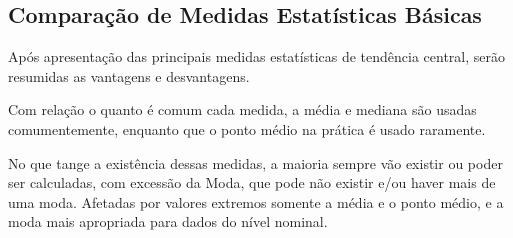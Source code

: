 


\subsection{Comparação de Medidas Estatísticas Básicas}

Após apresentação das principais medidas estatísticas de tendência central, serão resumidas as vantagens e desvantagens.\vskip0.3cm

Com relação o quanto é comum cada medida, a média e mediana são usadas comumentemente, enquanto que o ponto médio na prática é usado raramente.\vskip0.3cm

No que tange a existência dessas medidas, a maioria sempre vão existir ou poder ser calculadas, com excessão da Moda, que pode não existir e/ou haver mais de uma moda. Afetadas por valores extremos somente a média e o ponto médio, e a moda mais apropriada para dados do nível nominal.

